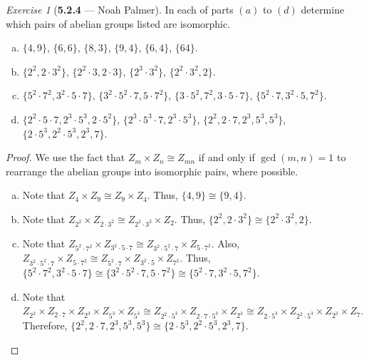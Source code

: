 \documentclass[12pt]{amsart}
\theoremstyle{remark}
\newtheorem*{exercise}{Exercise}%
\theoremstyle{mycomment}
\begin{document}
\begin{exercise}[\textbf{5.2.4} --- Noah Palmer] In each of parts $(a)$ to $(d)$ determine which pairs of abelian groups listed are isomorphic.
  \begin{enumerate}[(a)]
  \item $\{4,9\}$, $\{6,6\}$, $\{8,3\}$, $\{9,4\}$, $\{6,4\}$, $\{64\}$.
  \item $\{2^2, 2\cdot3^2\}$, $\{2^2\cdot3, 2\cdot3\}$, $\{2^3\cdot3^2\}$, $\{2^2\cdot3^2,2\}$.
  \item $\{5^2\cdot7^2,3^2\cdot5\cdot7\}$, $\{3^2\cdot5^2\cdot7,5\cdot7^2\}$, $\{3\cdot5^2,7^2,3\cdot5\cdot7\}$, $\{5^2\cdot7,3^2\cdot5,7^2\}$.
  \item $\{2^2\cdot5\cdot7, 2^3\cdot5^3,2\cdot5^2\}$, $\{2^3\cdot5^3\cdot7,2^3\cdot5^3\}$, $\{2^2,2\cdot7,2^3,5^3,5^3\}$, $\{2\cdot5^3,2^2\cdot5^3,2^3,7\}$.
  \end{enumerate}
  \begin{proof}
  We use the fact that $Z_m\times Z_n\cong Z_{mn}$ if and only if $\gcd(m,n)=1$ to rearrange the abelian groups into isomorphic pairs, where possible.
  \begin{enumerate}[(a)]
  \item Note that $ Z_4\times Z_9\cong Z_9\times Z_4$. Thus, $\{4,9\}\cong\{9,4\}$.
  \item Note that $ Z_{2^2}\times Z_{2\cdot3^2}\cong Z_{2^2\cdot3^2}\times Z_2$. Thus, $\{2^2, 2\cdot3^2\}\cong\{2^2\cdot3^2,2\}$.
  \item Note that $Z_{5^2\cdot 7^2}\times Z_{3^2\cdot 5\cdot 7}\cong Z_{3^2\cdot 5^2\cdot 7}\times Z_{5\cdot 7^2}$. Also, $Z_{3^2\cdot 5^2\cdot 7}\times Z_{5\cdot 7^2}\cong Z_{5^2\cdot 7}\times Z_{3^2\cdot 5}\times Z_{7^2}$. Thus, $\{5^2\cdot7^2,3^2\cdot5\cdot7\}\cong\{3^2\cdot5^2\cdot7,5\cdot7^2\}\cong\{5^2\cdot7,3^2\cdot5,7^2\}$.
  \item Note that $ Z_{2^2}\times Z_{2\cdot7}\times Z_{2^3}\times Z_{5^3}\times Z_{5^3}\cong Z_{2^2\cdot5^3}\times Z_{2\cdot7\cdot5^3}\times Z_{2^3}\cong Z_{2\cdot5^3}\times Z_{2^2\cdot5^3}\times Z_{2^3}\times Z_7$. Therefore, $\{2^2,2\cdot7,2^3,5^3,5^3\}\cong\{2\cdot5^3,2^2\cdot5^3,2^3,7\}$.
  \end{enumerate}
  \end{proof}
  \end{exercise}
\vspace{.15in}

  
\end{document}
